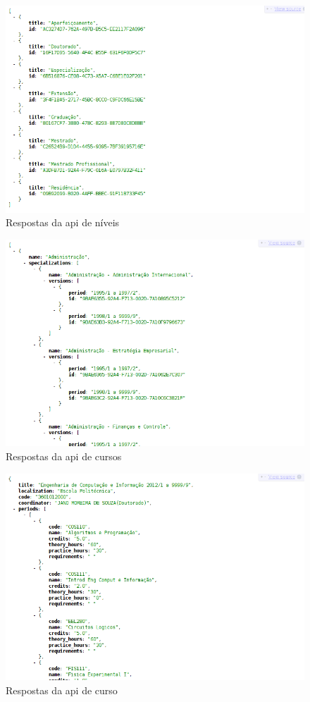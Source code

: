 \begin{figure}[H]
  \centering
    \includegraphics[width=\textwidth]{api_levels.png}
  \caption{Respostas da api de níveis}
\end{figure}
\begin{figure}[H]
  \centering
    \includegraphics[width=\textwidth]{api_courses.png}
  \caption{Respostas da api de cursos}
\end{figure}
\begin{figure}[H]
  \centering
    \includegraphics[width=\textwidth]{api_course.png}
  \caption{Respostas da api de curso}
\end{figure}

